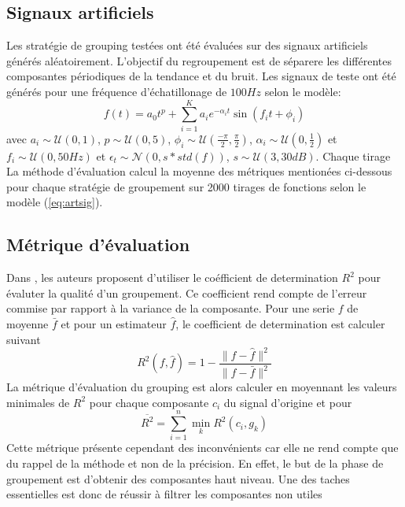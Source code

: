 \documentclass{gretsi}
\begin{document}
\subsection{Signaux artificiels}
\label{sub:artsig}
    Les stratégie de grouping testées ont été évaluées sur des signaux artificiels générés aléatoirement. L'objectif du regroupement est de séparere les différentes composantes périodiques de la tendance et du bruit. Les signaux de teste ont été générés pour une fréquence d'échatillonage de $100Hz$ selon le modèle:
    \begin{equation}\label{eq:artsig}
    f(t) = a_0 t^p + \sum_{i=1}^K a_i e^{-\alpha_i t} \sin\left(f_i t + \phi_i\right)
    \end{equation} avec $a_i \sim \mathcal U(0, 1)$, $p \sim \mathcal U(0, 5)$, $\displaystyle \phi_i \sim \mathcal U\left(\frac{-\pi}{2}, \frac{\pi}{2}\right)$, $\alpha_i \sim \mathcal U\left(0, \frac{1}{2}\right)$ et $f_i \sim \mathcal U(0, 50Hz)$ et $\epsilon_t \sim \mathcal N(0, s*std(f))$, $s \sim \mathcal U(3, 30dB)$. Chaque tirage\\
    
     La méthode d'évaluation calcul la moyenne des métriques mentionées ci-dessous pour chaque stratégie de groupement sur 2000 tirages de fonctions selon le modèle (\ref{eq:artsig}).


\subsection{Métrique d'évaluation}
\label{sub:}
Dans \cite{abalov_14_aut}, les auteurs proposent d'utiliser le coéfficient de determination $R^2$ pour évaluter la qualité d'un groupement. Ce coefficient rend compte de l'erreur commise par rapport à la variance de la composante. Pour une serie $f$ de moyenne $\bar f$ et pour un estimateur $\hat f$, le coefficient de determination est calculer suivant$$
R^2(f, \hat f) = 1 - \frac{\|f-\hat f\|^2}{\|f-\bar f\|^2}
$$ La métrique d'évaluation du grouping est alors calculer  en moyennant les valeurs minimales de $R^2$ pour chaque composante $c_i$ du signal d'origine et pour $$
\overline{ R^2} = \sum_{i=1}^n \min_k R^2(c_i, g_k)
$$Cette métrique présente cependant des inconvénients car elle ne rend compte que du rappel de la méthode et non de la précision. En effet, le but de la phase de groupement est d'obtenir des composantes haut niveau. Une des taches essentielles est donc de réussir à filtrer les composantes non utiles \cite{abalov_14_aut}
\end{document}
